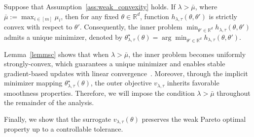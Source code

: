 \documentclass[sigconf]{acmart}
\begin{document}
\begin{lemma}
\label{lemmsc}
Suppose that Assumption~\ref{ass:weak_convexity} holds. If $\lambda>\bar{\mu}$, where $\bar{\mu}:=\max_{i\in[m]}\mu_i$, then for any fixed $\theta\in \mathbb{R}^d$, function $h_{\lambda,\tau}(\theta,\theta')$ is strictly convex with respect to $\theta'$. 
Consequently, the inner problem $\min_{\theta'\in \mathbb{R}^d} h_{\lambda,\tau}(\theta,\theta')$ admits a unique minimizer, denoted by $
\theta^{\star}_{\lambda,\tau}(\theta)
=
\arg\min_{\theta'\in\mathbb{R}^d} h_{\lambda,\tau}(\theta,\theta')$.
\end{lemma}

Lemma~\ref{lemmsc} shows that when $\lambda > \bar{\mu}$, the inner problem becomes uniformly strongly-convex, which guarantees a unique minimizer and enables stable gradient-based updates with linear convergence~\cite{boyd2004convex}. Moreover, through the implicit minimizer mapping $\theta^{\star}_{\lambda,\tau}(\theta)$, the outer objective $v_{\lambda,\tau}$ inherits favorable smoothness properties. Therefore, we will impose the condition $\lambda > \bar{\mu}$ throughout the remainder of the analysis.

Finally, we show that the surrogate $v_{\lambda,\tau}(\theta)$ preserves the weak Pareto optimal property up to a controllable tolerance.
\end{document}
